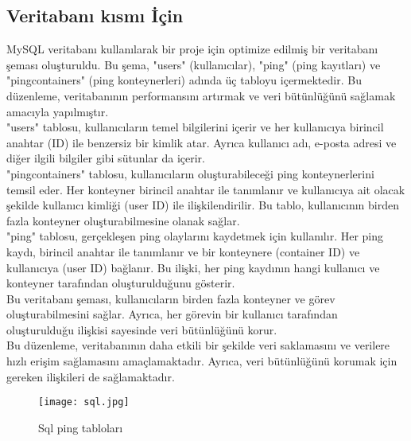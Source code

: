  \subsection {Veritabanı kısmı İçin }
 MySQL veritabanı kullanılarak bir proje için optimize edilmiş bir veritabanı şeması oluşturuldu. Bu şema, "users" (kullanıcılar), "ping" (ping kayıtları) ve "pingcontainers" (ping konteynerleri) adında üç tabloyu içermektedir. Bu düzenleme, veritabanının performansını artırmak ve veri bütünlüğünü sağlamak amacıyla yapılmıştır.\\
"users" tablosu, kullanıcıların temel bilgilerini içerir ve her kullanıcıya birincil anahtar (ID) ile benzersiz bir kimlik atar. Ayrıca kullanıcı adı, e-posta adresi ve diğer ilgili bilgiler gibi sütunlar da içerir.\\
"pingcontainers" tablosu, kullanıcıların oluşturabileceği ping konteynerlerini temsil eder. Her konteyner birincil anahtar ile tanımlanır ve kullanıcıya ait olacak şekilde kullanıcı kimliği (user ID) ile ilişkilendirilir. Bu tablo, kullanıcının birden fazla konteyner oluşturabilmesine olanak sağlar.\\
"ping" tablosu, gerçekleşen ping olaylarını kaydetmek için kullanılır. Her ping kaydı, birincil anahtar ile tanımlanır ve bir konteynere (container ID) ve kullanıcıya (user ID) bağlanır. Bu ilişki, her ping kaydının hangi kullanıcı ve konteyner tarafından oluşturulduğunu gösterir.\\
Bu veritabanı şeması, kullanıcıların birden fazla konteyner ve görev oluşturabilmesini sağlar. Ayrıca, her görevin bir kullanıcı tarafından oluşturulduğu ilişkisi sayesinde veri bütünlüğünü korur.\\
Bu düzenleme, veritabanının daha etkili bir şekilde veri saklamasını ve verilere hızlı erişim sağlamasını amaçlamaktadır. Ayrıca, veri bütünlüğünü korumak için gereken ilişkileri de sağlamaktadır.\\
 \begin{figure}[htbp]
    \centering
    \texttt{[image: sql.jpg]}
    \caption{Sql ping tabloları}
    \label{fig:resim_etiketi}
  \end{figure}



